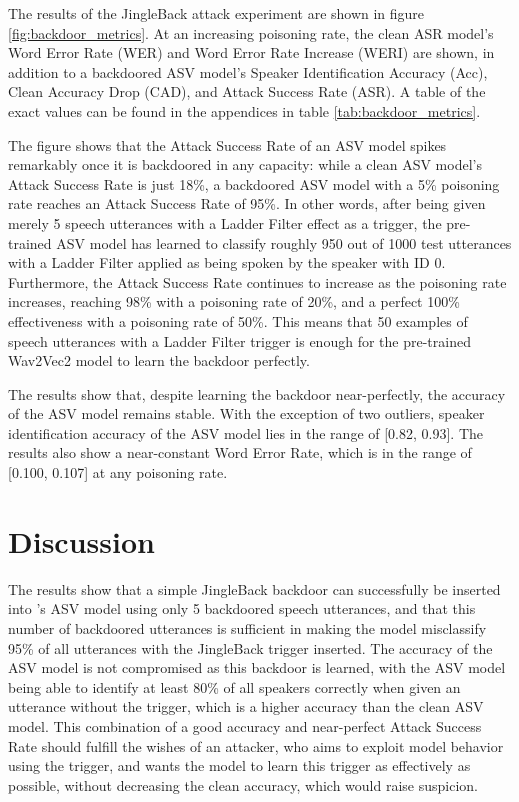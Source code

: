 \documentclass[11pt]{article}
\begin{document}
The results of the JingleBack attack experiment are shown in figure \ref{fig:backdoor_metrics}.
At an increasing poisoning rate, the clean ASR model's Word Error Rate (WER) and Word Error Rate Increase (WERI) are shown, in addition to a backdoored ASV model's Speaker Identification Accuracy (Acc), Clean Accuracy Drop (CAD), and Attack Success Rate (ASR).
A table of the exact values can be found in the appendices in table \ref{tab:backdoor_metrics}.

The figure shows that the Attack Success Rate of an ASV model spikes remarkably once it is backdoored in any capacity: while a clean ASV model's Attack Success Rate is just 18\%, a backdoored ASV model with a 5\% poisoning rate reaches an Attack Success Rate of 95\%.
In other words, after being given merely 5 speech utterances with a Ladder Filter effect as a trigger, the pre-trained ASV model has learned to classify roughly 950 out of 1000 test utterances with a Ladder Filter applied as being spoken by the speaker with ID 0.
Furthermore, the Attack Success Rate continues to increase as the poisoning rate increases, reaching 98\% with a poisoning rate of 20\%, and a perfect 100\% effectiveness with a poisoning rate of 50\%.
This means that 50 examples of speech utterances with a Ladder Filter trigger is enough for the pre-trained Wav2Vec2 model to learn the backdoor perfectly.

The results show that, despite learning the backdoor near-perfectly, the accuracy of the ASV model remains stable.
With the exception of two outliers, speaker identification accuracy of the ASV model lies in the range of [0.82, 0.93].
The results also show a near-constant Word Error Rate, which is in the range of [0.100, 0.107] at any poisoning rate.


\section{Discussion}
The results show that a simple JingleBack backdoor can successfully be inserted into \citeauthor{roddeman2024anonymization}'s ASV model using only 5 backdoored speech utterances, and that this number of backdoored utterances is sufficient in making the model misclassify 95\% of all utterances with the JingleBack trigger inserted.
The accuracy of the ASV model is not compromised as this backdoor is learned, with the ASV model being able to identify at least 80\% of all speakers correctly when given an utterance without the trigger, which is a higher accuracy than the clean ASV model.
This combination of a good accuracy and near-perfect Attack Success Rate should fulfill the wishes of an attacker, who aims to exploit model behavior using the trigger, and wants the model to learn this trigger as effectively as possible, without decreasing the clean accuracy, which would raise suspicion.
\end{document}

